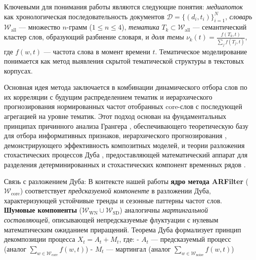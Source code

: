\documentclass[14pt,a4paper]{article}
\begin{document}
Ключевыми для понимания работы являются следующие понятия: \textit{медиапоток} как хронологическая последовательность документов \(\mathcal{D} = \{(d_i,t_i)\}_{i=1}^{N}\), \textit{словарь} \(\mathcal{W}_{\mathrm{all}}\) — множество \(n\)-грамм (\(1 \leq n \leq 4\)), \textit{тематика} \(T_k \subset \mathcal{W}_{\mathrm{all}}\) — семантический кластер слов, образующий разбиение словаря, и \textit{доля темы} \(\nu_k(t) = \frac{f(T_k,t)}{\sum_j f(T_j,t)}\), где \(f(w,t)\) — частота слова в момент времени \(t\). Тематическое моделирование понимается как метод выявления скрытой тематической структуры в текстовых корпусах.

Основная идея метода заключается в комбинации динамического отбора слов по их корреляции с будущим распределением тематик и иерархического прогнозирования нормированных частот отобранных core-слов с последующей агрегацией на уровне тематик. Этот подход основан на фундаментальных принципах причинного анализа Грангера \cite{Granger1969}, обеспечивающего теоретическую базу для отбора информативных признаков, иерархического прогнозирования \cite{Hyndman2011}, демонстрирующего эффективность композитных моделей, и теории разложения стохастических процессов Дуба \cite{Doob1953}, предоставляющей математический аппарат для разделения детерминированных и стохастических компонент временных рядов \cite{Hamilton1994} \cite{Engle1982}. 

Связь с разложением Дуба: 
В контексте нашей работы \textbf{ядро метода ARFilter} (\(\mathcal{W}_{\text{core}}\)) соответствует \textit{предсказуемой компоненте} в разложении Дуба, характеризующей устойчивые тренды и сезонные паттерны частот слов. \textbf{Шумовые компоненты} (\(\mathcal{W}_{\text{WN}} \cup \mathcal{W}_{\text{SD}}\)) аналогичны \textit{мартингальной составляющей}, описывающей непредсказуемые флуктуации с нулевым математическим ожиданием приращений. Теорема Дуба формализует принцип декомпозиции процесса \(X_t = A_t + M_t\), где:
- \(A_t\) — предсказуемый процесс (аналог \(\sum_{w \in \mathcal{W}_{\text{core}}} f(w,t)\))
- \(M_t\) — мартингал (аналог \(\sum_{w \in \mathcal{W}_{\text{noise}}} f(w,t)\)) \cite{Engle1982} 
\end{document}
